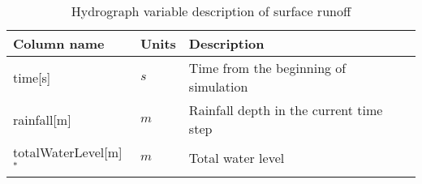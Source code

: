 \begin{table}[t]
 

 \centering
 \caption{Hydrograph variable description of surface runoff}
\label{tab:hydrographs}
\begin{tabular}{llp{}}
  \hline  \hline
 Column name  & Units      & Description       \\
  \hline
 time[s]          &   $s$      &  Time from the beginning of simulation          \\
 rainfall[m]      &  $m$         &  Rainfall depth in the current time step \\
 totalWaterLevel[m]$^*$   &   $m$   &  Total water level  \\

\end{tabular}
\end{table}

